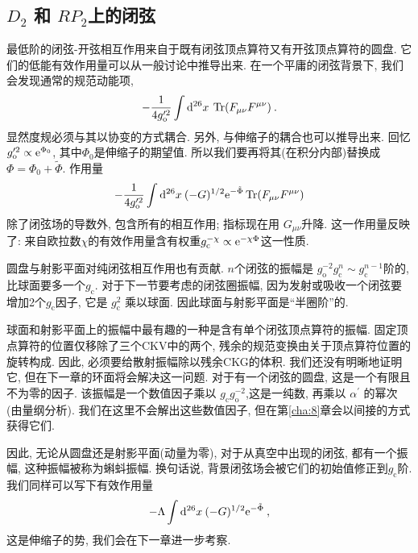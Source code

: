 \subsection*{$D_{2}$ 和 $R P_{2}$上的闭弦}
最低阶的闭弦-开弦相互作用来自于既有闭弦顶点算符又有开弦顶点算符的圆盘. 它们的低能有效作用量可以从一般讨论中推导出来. 
在一个平庸的闭弦背景下, 我们会发现通常的规范动能项,
\begin{equation}
	-\frac{1}{4 g_{\mathrm{o}}^{\prime 2}} \int \mathrm{d}^{26} x\: \operatorname{Tr}(F_{\mu \nu} F^{\mu \nu}) \:. \label{6.6.26}
\end{equation}
显然度规必须与其以协变的方式耦合. 另外, 与伸缩子的耦合也可以推导出来. 回忆 $g_{\mathrm{o}}^{\prime 2} \propto \mathrm{e}^{\Phi_{0}}$,  
其中$\Phi_{0}$是伸缩子的期望值. 所以我们要再将其(在积分内部)替换成 $\Phi=\Phi_{0}+\tilde{\Phi}$. 作用量
\begin{equation}
	-\frac{1}{4 g_{\mathrm{o}}^{\prime 2}} \int \mathrm{d}^{26} x \: (-G)^{1/2} \mathrm{e}^{-\tilde{\Phi}} 
	\operatorname{Tr}(F_{\mu \nu} F^{\mu \nu}) \label{6.6.27}
\end{equation}
除了闭弦场的导数外, 包含所有的相互作用; 指标现在用 $G_{\mu \nu} $升降. 这一作用量反映了: 来自欧拉数$\chi$的有效作用量含有权重$g_{\mathrm{c}}^{-\chi} \propto \mathrm{e}^{-\chi \Phi}$这一性质.

圆盘与射影平面对纯闭弦相互作用也有贡献. $n$个闭弦的振幅是 $g_{\mathrm{o}}^{-2} g_{\mathrm{c}}^{n} \sim g_{\mathrm{c}}^{n-1}$阶的, 
比球面要多一个$g_{\mathrm{c}}$. 对于下一节要考虑的闭弦圈振幅, 因为发射或吸收一个闭弦要增加2个$g_{\mathrm{c}} $因子, 它是 $g_{\mathrm{c}}^{2}$ 乘以球面. 
因此球面与射影平面是``半圈阶''的.

球面和射影平面上的振幅中最有趣的一种是含有单个闭弦顶点算符的振幅. 固定顶点算符的位置仅移除了三个CKV中的两个, 残余的规范变换由关于顶点算符位置的旋转构成. 
因此, 必须要给散射振幅除以残余CKG的体积. 我们还没有明晰地证明它, 但在下一章的环面将会解决这一问题. 对于有一个闭弦的圆盘, 这是一个有限且不为零的因子. 
该振幅是一个数值因子乘以 $g_{\mathrm{c}} g_{\mathrm{o}}^{-2}$,这是一纯数, 再乘以 $\alpha^{\prime}$ 的幂次(由量纲分析). 
我们在这里不会解出这些数值因子, 但在第\ref{cha:8}章会以间接的方式获得它们. 

因此, 无论从圆盘还是射影平面(动量为零), 对于从真空中出现的闭弦, 都有一个振幅, 这种振幅被称为蝌蚪振幅. 换句话说, 背景闭弦场会被它们的初始值修正到$g_{\mathrm{c}}$阶. 我们同样可以写下有效作用量
\begin{equation}
	-\Lambda \int \mathrm{d}^{26} x \: (-G)^{1/2} \mathrm{e}^{-\tilde{\Phi}} \:, \label{6.6.28}
\end{equation}
这是伸缩子的势, 我们会在下一章进一步考察.

